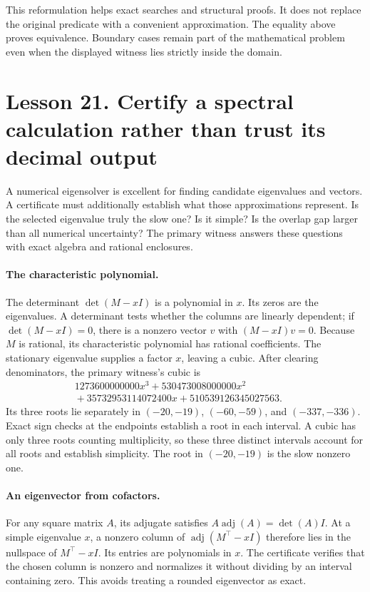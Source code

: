 \documentclass[11pt]{article}
\begin{document}
This reformulation helps exact searches and structural proofs. It does not
replace the original predicate with a convenient approximation. The equality
above proves equivalence. Boundary cases remain part of the mathematical
problem even when the displayed witness lies strictly inside the domain.

\clearpage
\section*{Lesson 21. Certify a spectral calculation rather than trust its decimal output}
A numerical eigensolver is excellent for finding candidate eigenvalues and
vectors. A certificate must additionally establish what those approximations
represent. Is the selected eigenvalue truly the slow one? Is it simple? Is
the overlap gap larger than all numerical uncertainty? The primary witness
answers these questions with exact algebra and rational enclosures.

\paragraph{The characteristic polynomial.}
The determinant $\det(M-xI)$ is a polynomial in $x$. Its zeros are the
eigenvalues. A determinant tests whether the columns are linearly dependent;
if $\det(M-xI)=0$, there is a nonzero vector $v$ with $(M-xI)v=0$.
Because $M$ is rational, its characteristic polynomial has rational
coefficients. The stationary eigenvalue supplies a factor $x$, leaving a
cubic. After clearing denominators, the primary witness's cubic is
\[
\begin{split}
1273600000000x^3+530473008000000x^2\qquad\qquad\quad\\
{}+35732953114072400x+510539126345027563.
\end{split}
\]
Its three roots lie separately in $(-20,-19)$, $(-60,-59)$, and
$(-337,-336)$. Exact sign checks at the endpoints establish a root in each
interval. A cubic has only three roots counting multiplicity, so these
three distinct intervals account for all roots and establish simplicity.
The root in $(-20,-19)$ is the slow nonzero one.

\paragraph{An eigenvector from cofactors.}
For any square matrix $A$, its adjugate satisfies
$A\operatorname{adj}(A)=\det(A)I$. At a simple eigenvalue $x$, a nonzero
column of $\operatorname{adj}(M^\top-xI)$ therefore lies in the nullspace
of $M^\top-xI$. Its entries are polynomials in $x$. The certificate verifies
that the chosen column is nonzero and normalizes it without dividing by an
interval containing zero. This avoids treating a rounded eigenvector as exact.
\end{document}
